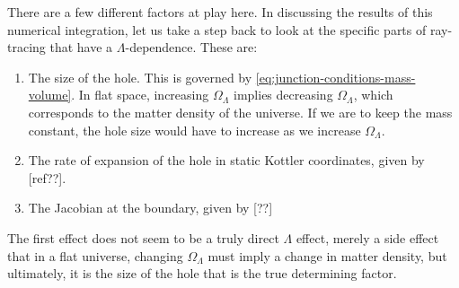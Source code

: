 There are a few different factors at play here. In discussing the results of this numerical integration, let us take a step back to look at the specific parts of ray-tracing that have a $\Lambda$-dependence. These are:
\begin{enumerate}
  \item The size of the hole. This is governed by \autoref{eq:junction-conditions-mass-volume}. In flat space, increasing $\Omega_{\Lambda}$ implies decreasing $\Omega_{\Lambda}$, which corresponds to the matter density of the universe. If we are to keep the mass constant, the hole size would have to increase as we increase $\Omega_{\Lambda}$. 
  \item The rate of expansion of the hole in static Kottler coordinates, given by [ref??].  
  \item The Jacobian at the boundary, given by [??]
\end{enumerate}

The first effect does not seem to be a truly direct $\Lambda$ effect, merely a side effect that in a flat universe, changing $\Omega_{\Lambda}$ must imply a change in matter density, but ultimately, it is the size of the hole that is the true determining factor. 